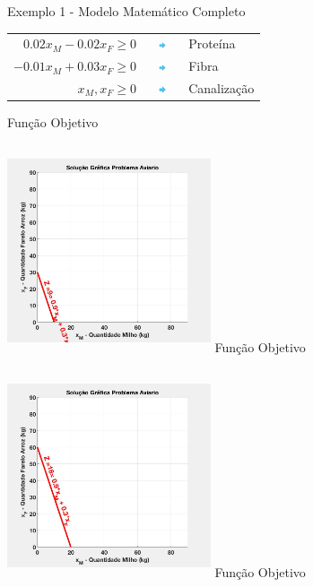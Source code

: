 \documentclass{beamer}
\begin{document}
\begin{frame}
\begin{columns}
\begin{column}{0.8\textwidth}
\begin{exampleblock}{Exemplo 1 - Modelo Matemático Completo}
\begin{table}
{\begin{tabular}{r c l}
						$0.02x_M-0.02x_F \ge 0$ & \includegraphics[width=0.8cm,height=0.2cm]{seta2.png}& Proteína \\
						$-0.01x_M+0.03x_F \ge 0$ & \includegraphics[width=0.8cm,height=0.2cm]{seta2.png}& Fibra \\
						$x_M, x_F \ge 0$ & \includegraphics[width=0.8cm,height=0.2cm]{seta2.png}& Canalização \\
					\end{tabular}
					}					
				\end{table}
				{	
					Função Objetivo \\~\\
					\includegraphics[width=6cm,height=6cm]{MatLab/aviario_1.png}
				}
				\only<4>
				{	
					Função Objetivo \\~\\
					\includegraphics[width=6cm,height=6cm]{MatLab/aviario_2.png}
				}
				\only<5>
				{	
					Função Objetivo \\~\\
}
\end{exampleblock}
\end{column}
\end{columns}
\end{frame}
\end{document}
